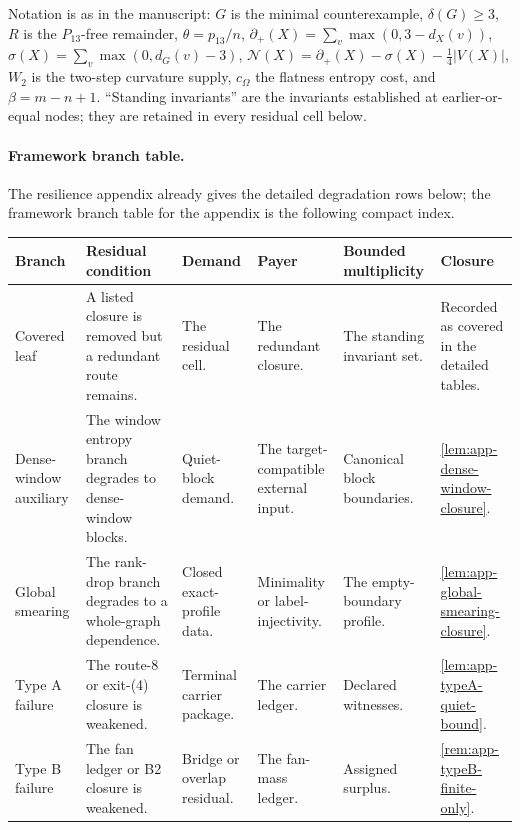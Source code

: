 \documentclass[11pt]{article}
\newcommand{\defp}{\partial_+}
\newcommand{\No}{\mathcal N}
\newcommand{\FrameworkBranchTableHeader}{%
\toprule
\textbf{Branch} & \textbf{Residual condition} & \textbf{Demand} & \textbf{Payer} & \textbf{Bounded multiplicity} & \textbf{Closure}\\
\midrule
}
\begin{document}
Notation is as in the manuscript: $G$ is the minimal counterexample, $\delta(G)\ge3$, $R$ is the $P_{13}$-free remainder, $\theta=p_{13}/n$, $\defp(X)=\sum_v\max(0,3-d_X(v))$, $\sigma(X)=\sum_v\max(0,d_G(v)-3)$, $\No(X)=\defp(X)-\sigma(X)-\tfrac14|V(X)|$, $W_2$ is the two-step curvature supply, $c_\Omega$ the flatness entropy cost, and $\beta=m-n+1$.  ``Standing invariants'' are the invariants established at earlier-or-equal nodes; they are retained in every residual cell below.

\paragraph{Framework branch table.}
The resilience appendix already gives the detailed degradation rows below; the
framework branch table for the appendix is the following compact index.
\begin{longtable}{L{0.13\textwidth} L{0.19\textwidth} L{0.14\textwidth} L{0.14\textwidth} L{0.17\textwidth} L{0.17\textwidth}}
\FrameworkBranchTableHeader
Covered leaf
&
A listed closure is removed but a redundant route remains.
&
The residual cell.
&
The redundant closure.
&
The standing invariant set.
&
Recorded as covered in the detailed tables.
\\
\addlinespace
Dense-window auxiliary
&
The window entropy branch degrades to dense-window blocks.
&
Quiet-block demand.
&
The target-compatible external input.
&
Canonical block boundaries.
&
\cref{lem:app-dense-window-closure}.
\\
\addlinespace
Global smearing
&
The rank-drop branch degrades to a whole-graph dependence.
&
Closed exact-profile data.
&
Minimality or label-injectivity.
&
The empty-boundary profile.
&
\cref{lem:app-global-smearing-closure}.
\\
\addlinespace
Type A failure
&
The route-8 or exit-\textup{(4)} closure is weakened.
&
Terminal carrier package.
&
The carrier ledger.
&
Declared witnesses.
&
\cref{lem:app-typeA-quiet-bound}.
\\
\addlinespace
Type B failure
&
The fan ledger or B2 closure is weakened.
&
Bridge or overlap residual.
&
The fan-mass ledger.
&
Assigned surplus.
&
\cref{rem:app-typeB-finite-only}.
\\
\bottomrule
\end{longtable}
\end{document}
